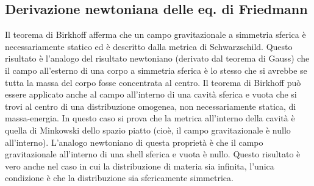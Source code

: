 \subsection{Derivazione newtoniana delle eq. di Friedmann}

Il teorema di Birkhoff afferma che un campo gravitazionale a simmetria sferica è
necessariamente statico ed è descritto dalla metrica di Schwarzschild.  Questo
risultato è l'analogo del risultato newtoniano (derivato dal teorema di Gauss)
che il campo all'esterno di una corpo a simmetria sferica è lo stesso che si
avrebbe se tutta la massa del corpo fosse concentrata al centro.  Il teorema di
Birkhoff può essere applicato anche al campo all'interno di una cavità sferica e
vuota che si trovi al centro di una distribuzione omogenea, non necessariamente
statica, di massa-energia.  In questo caso si prova che la metrica all'interno
della cavità è quella di Minkowski dello spazio piatto (cioè, il campo
gravitazionale è nullo all'interno).  L'analogo newtoniano di questa proprietà è
che il campo gravitazionale all'interno di una shell sferica e vuota è nullo.
Questo risultato è vero anche nel caso in cui la distribuzione di materia sia
infinita, l'unica condizione è che la distribuzione sia sfericamente simmetrica.


